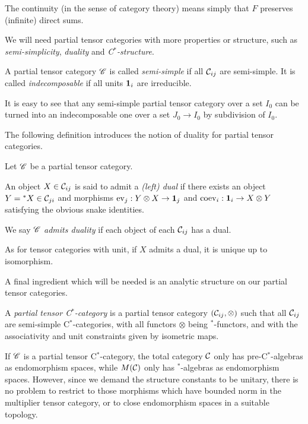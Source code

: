\begin{Rem} The continuity (in the sense of category theory) means simply that $F$ preserves (infinite) direct sums.
\end{Rem}

We will need partial tensor categories with more properties or structure, such as \emph{semi-simplicity}, \emph{duality} and \emph{C$^*$-structure}.

\begin{Def} A partial tensor category $\mathscr{C}$ is called \emph{semi-simple} if all $\mathcal{C}_{ij}$ are semi-simple. It is called \emph{indecomposable} if all units $\mathbf{1}_i$ are irreducible. 
\end{Def}

It is easy to see that any semi-simple partial tensor category over a set $I_0$ can be turned into an indecomposable one over a set $J_0\rightarrow I_0$ by subdivision of $I_0$.

The following definition introduces the notion of duality for partial tensor categories.

\begin{Def} Let $\mathscr{C}$ be a partial tensor category. 

An object $X\in \mathcal{C}_{ij}$ is said to admit a \emph{(left) dual} if there exists an object $Y={}^*X \in \mathcal{C}_{ji}$ and morphisms $\mathrm{ev}_{j}: Y\otimes X \rightarrow \mathbf{1}_j$ and $\mathrm{coev}_i: \mathbf{1}_i\rightarrow X\otimes Y$ satisfying the obvious snake identities.

We say $\mathscr{C}$ \emph{admits duality} if each object of each $\mathcal{C}_{ij}$ has a dual.
\end{Def}

As for tensor categories with unit, if $X$ admits a dual, it is unique up to isomorphism. 

A final ingredient which will be needed is an analytic structure on our partial tensor categories.

\begin{Def} A \emph{partial tensor C$^*$-category} is a partial tensor category $(\mathcal{C}_{ij},\otimes)$ such that all $\mathcal{C}_{ij}$ are semi-simple C$^*$-categories, with all functors $\otimes$ being $^*$-functors, and with the associativity and unit constraints given by isometric maps.   
\end{Def} 

\begin{Rem} If $\mathscr{C}$ is a partial tensor C$^*$-category, the total category $\mathcal{C}$ only has pre-C$^*$-algebras as endomorphism spaces, while $M(\mathcal{C})$ only has $^*$-algebras as endomorphism spaces. However, since we demand the structure constants to be unitary, there is no problem to restrict to those morphisms which have bounded norm in the multiplier tensor category, or to close endomorphism spaces in a suitable topology. %
\end{Rem}

